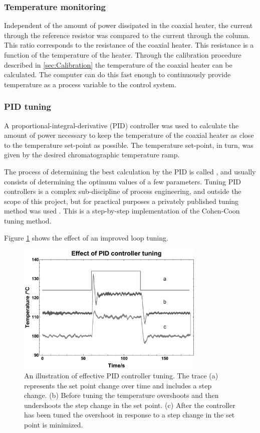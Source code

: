 \subsubsection{Temperature monitoring}

Independent of the amount of power dissipated in the coaxial heater, the current
through the reference resistor was compared to the current through the column.
This ratio corresponds to the resistance of the coaxial heater. This resistance
is a function of the temperature of the heater. Through the calibration
procedure described in \ref{sec:Calibration} the temperature of the coaxial
heater can be calculated. The computer can do this fast enough to continuously
provide temperature as a process variable to the control system.

\subsubsection{PID tuning}

A proportional-integral-derivative (PID) controller was used to calculate the
amount of power necessary to keep the temperature of the coaxial heater as close
to the temperature set-point as possible. The temperature set-point, in turn,
was given by the desired chromatographic temperature ramp.

The process of determining the best calculation by the PID is called
, and usually consists of determining the optimum values of a
few parameters. Tuning PID controllers is a complex sub-discipline of process
engineering, and outside the scope of this project, but for practical purposes a
privately published tuning method was used \autocite{Peacock2008}. This is a
step-by-step  implementation of the Cohen-Coon tuning method.

Figure \ref{fig:LoopTuning} shows the effect of an improved loop tuning. 

\begin{figure}
	\centering
	\includegraphics[width=0.8\textwidth]{Figures/LoopTuningGraph.pdf}
	\decoRule	
	\caption[Effect of controller tuning]{An illustration of effective PID
	controller tuning. The trace (a) represents the set point change over time and
	includes a step change. (b) Before tuning the temperature overshoots and then
	undershoots the step change in the set point. (c) After the controller has been
	tuned the overshoot in response to a step change in the set point is minimized. }
	\label{fig:LoopTuning} 
\end{figure}


